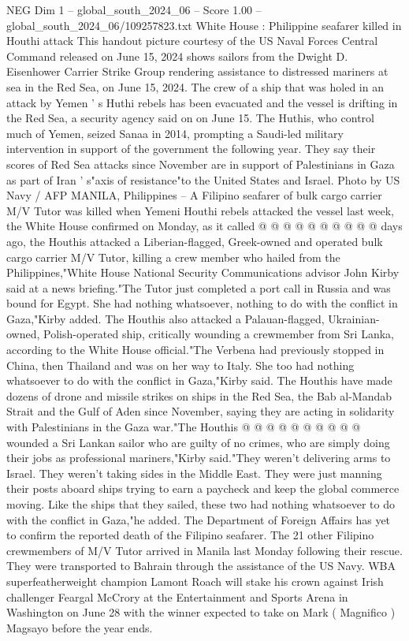 \begin{textsample}{NEG Dim 1 – global\_south\_2024\_06 – Score 1.00 – global\_south\_2024\_06/109257823.txt}  \label{ex:f1_neg_404}
White House : Philippine seafarer killed in Houthi attack This handout picture courtesy of the US Naval Forces Central Command released on June 15, 2024 shows sailors from the Dwight D.
Eisenhower Carrier Strike Group rendering assistance to distressed mariners at sea in the Red Sea, on June 15, 2024.
The crew of a ship that was holed in an attack by Yemen ' s Huthi rebels has been evacuated and the vessel is drifting in the Red Sea, a security agency said on on June 15.
The Huthis, who control much of Yemen, seized Sanaa in 2014, prompting a Saudi-led military intervention in support of the government the following year.
They say their scores of Red Sea attacks since November are in support of Palestinians in Gaza as part of Iran ' s"axis of resistance"to the United States and Israel.
Photo by US Navy / AFP MANILA, Philippines -- A Filipino seafarer of bulk cargo carrier M/V Tutor was killed when Yemeni Houthi rebels attacked the vessel last week, the White House confirmed on Monday, as it called @ @ @ @ @ @ @ @ @ @ days ago, the Houthis attacked a Liberian-flagged, Greek-owned and operated bulk cargo carrier M/V Tutor, killing a crew member who hailed from the Philippines,"White House National Security Communications advisor John Kirby said at a news briefing."The Tutor just completed a port call in Russia and was bound for Egypt.
She had nothing whatsoever, nothing to do with the conflict in Gaza,"Kirby added.
The Houthis also attacked a Palauan-flagged, Ukrainian-owned, Polish-operated ship, critically wounding a crewmember from Sri Lanka, according to the White House official."The Verbena had previously stopped in China, then Thailand and was on her way to Italy.
She too had nothing whatsoever to do with the conflict in Gaza,"Kirby said.
The Houthis have made dozens of drone and missile strikes on ships in the Red Sea, the Bab al-Mandab Strait and the Gulf of Aden since November, saying they are acting in solidarity with Palestinians in the Gaza war."The Houthis @ @ @ @ @ @ @ @ @ @ wounded a Sri Lankan sailor who are guilty of no crimes, who are simply doing their jobs as professional mariners,"Kirby said."They weren't delivering arms to Israel.
They weren't taking sides in the Middle East.
They were just manning their posts aboard ships trying to earn a paycheck and keep the global commerce moving.
Like the ships that they sailed, these two had nothing whatsoever to do with the conflict in Gaza,"he added.
The Department of Foreign Affairs has yet to confirm the reported death of the Filipino seafarer.
The 21 other Filipino crewmembers of M/V Tutor arrived in Manila last Monday following their rescue.
They were transported to Bahrain through the assistance of the US Navy.
WBA superfeatherweight champion Lamont Roach will stake his crown against Irish challenger Feargal McCrory at the Entertainment and Sports Arena in Washington on June 28 with the winner expected to take on Mark ( Magnifico ) Magsayo before the year ends.

\end{textsample}
